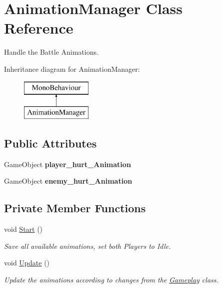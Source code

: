 \hypertarget{class_animation_manager}{}\section{Animation\+Manager Class Reference}
\label{class_animation_manager}


Handle the Battle Animations.  


Inheritance diagram for Animation\+Manager\+:\begin{figure}[H]
\begin{center}
\leavevmode
\includegraphics[height=2.000000cm]{class_animation_manager}
\end{center}
\end{figure}
\subsection*{Public Attributes}
\begin{DoxyCompactItemize}
\item 
\mbox{\label{class_animation_manager_a54734a6a94c300598882d4fa6f17f68d}} 
Game\+Object {\bfseries player\+\_\+hurt\+\_\+\+Animation}
\item 
\mbox{\label{class_animation_manager_a3cd204fdfeeeec9bfa687f26a849df5a}} 
Game\+Object {\bfseries enemy\+\_\+hurt\+\_\+\+Animation}
\end{DoxyCompactItemize}
\subsection*{Private Member Functions}
\begin{DoxyCompactItemize}
\item 
\mbox{\label{class_animation_manager_a24e3383ca8d2acf1cf37211f8e9f2131}} 
void \mbox{\hyperlink{class_animation_manager_a24e3383ca8d2acf1cf37211f8e9f2131}{Start}} ()
\begin{DoxyCompactList}\small\item\em Save all available animations, set both Players to Idle. \end{DoxyCompactList}\item 
\mbox{\label{class_animation_manager_ab9a2c78491bf79117b01db0a26b7f12d}} 
void \mbox{\hyperlink{class_animation_manager_ab9a2c78491bf79117b01db0a26b7f12d}{Update}} ()
\begin{DoxyCompactList}\small\item\em Update the animations according to changes from the \mbox{\hyperlink{class_gameplay}{Gameplay}} class. \end{DoxyCompactList}\end{DoxyCompactItemize}
